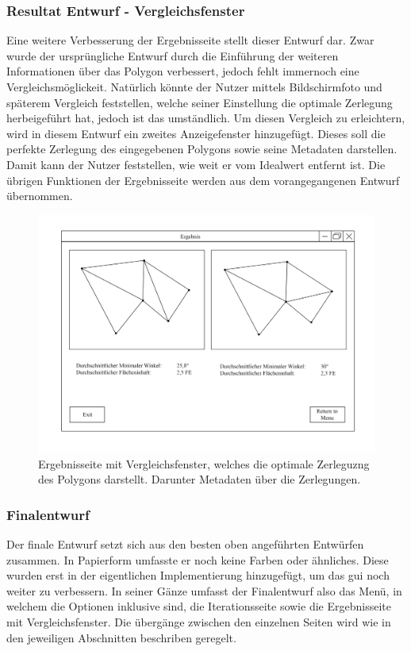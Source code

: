 \subsubsection{Resultat Entwurf - Vergleichsfenster}
Eine weitere Verbesserung der Ergebnisseite stellt dieser Entwurf dar. Zwar wurde der ursprüngliche Entwurf durch die Einführung der weiteren Informationen über das Polygon verbessert, jedoch fehlt immernoch eine Vergleichsmöglickeit.
Natürlich könnte der Nutzer mittels Bildschirmfoto und späterem Vergleich feststellen, welche seiner Einstellung die optimale Zerlegung herbeigeführt hat, jedoch ist das umständlich.
Um diesen Vergleich zu erleichtern, wird in diesem Entwurf ein zweites Anzeigefenster hinzugefügt. Dieses soll die perfekte Zerlegung des eingegebenen Polygons sowie seine Metadaten darstellen.
Damit kann der Nutzer feststellen, wie weit er vom Idealwert entfernt ist. Die übrigen Funktionen der Ergebnisseite werden aus dem vorangegangenen Entwurf übernommen.

\begin{figure}[h]
    \includegraphics[width=1\textwidth]{bilder/ergebnis_vergleich.png}
    \caption[Entwurf Ergebnisseite mit Vergleichsfenster]{Ergebnisseite mit Vergleichsfenster, welches die optimale Zerleguzng des Polygons darstellt. Darunter Metadaten über die Zerlegungen.}
    \label{fig:ergebnis_vergleich}
\end{figure}

\subsubsection{Finalentwurf}
Der finale Entwurf setzt sich aus den besten oben angeführten Entwürfen zusammen. In Papierform umfasste er noch keine Farben oder ähnliches. Diese wurden erst in der eigentlichen Implementierung hinzugefügt, um das \ac{gui} noch weiter zu verbessern.
In seiner Gänze umfasst der Finalentwurf also das Menü, in welchem die Optionen inklusive sind, die Iterationsseite sowie die Ergebnisseite mit Vergleichsfenster. Die übergänge zwischen den einzelnen Seiten wird wie in den jeweiligen Abschnitten beschriben geregelt.


